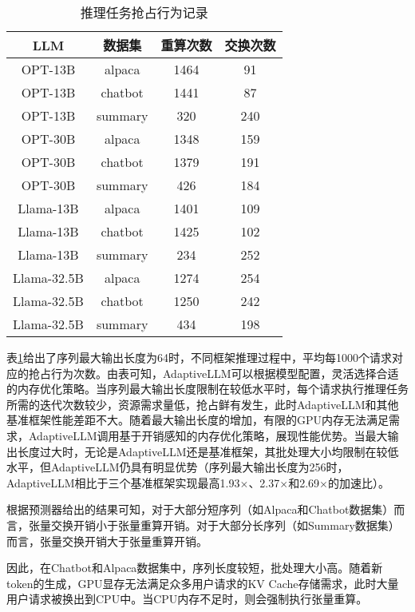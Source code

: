 \begin{table}[H]
  \centering
  \caption{推理任务抢占行为记录}
  \label{Table:推理任务抢占行为记录}
  \renewcommand{\arraystretch}{1.25}
  \small
  \begin{tabular}{c c c c}
    \toprule
    \textbf{LLM} & \textbf{数据集} & \textbf{重算次数} & \textbf{交换次数} \\
    \midrule
    OPT-13B & alpaca & 1464 & 91 \\
    OPT-13B & chatbot & 1441 & 87 \\
    OPT-13B & summary & 320 & 240 \\
    OPT-30B & alpaca & 1348 & 159 \\
    OPT-30B & chatbot & 1379 & 191 \\
    OPT-30B & summary & 426 & 184 \\
    Llama-13B & alpaca & 1401 & 109 \\
    Llama-13B & chatbot & 1425 & 102 \\
    Llama-13B & summary & 234 & 252 \\
    Llama-32.5B & alpaca & 1274 & 254 \\
    Llama-32.5B & chatbot & 1250 & 242 \\
    Llama-32.5B & summary & 434 & 198 \\
    \bottomrule
  \end{tabular}
\end{table}

表\ref{Table:推理任务抢占行为记录}给出了序列最大输出长度为64时，不同框架推理过程中，平均每1000个请求对应的抢占行为次数。由表可知，AdaptiveLLM可以根据模型配置，灵活选择合适的内存优化策略。当序列最大输出长度限制在较低水平时，每个请求执行推理任务所需的迭代次数较少，资源需求量低，抢占鲜有发生，此时AdaptiveLLM和其他基准框架性能差距不大。随着最大输出长度的增加，有限的GPU内存无法满足需求，AdaptiveLLM调用基于开销感知的内存优化策略，展现性能优势。当最大输出长度过大时，无论是AdaptiveLLM还是基准框架，其批处理大小均限制在较低水平，但AdaptiveLLM仍具有明显优势（序列最大输出长度为256时，AdaptiveLLM相比于三个基准框架实现最高1.93$\times$、2.37$\times$和2.69$\times$的加速比）。

根据预测器给出的结果可知，对于大部分短序列（如Alpaca和Chatbot数据集）而言，张量交换开销小于张量重算开销。对于大部分长序列（如Summary数据集）而言，张量交换开销大于张量重算开销。

因此，在Chatbot和Alpaca数据集中，序列长度较短，批处理大小高。随着新token的生成，GPU显存无法满足众多用户请求的KV Cache存储需求，此时大量用户请求被换出到CPU中。当CPU内存不足时，则会强制执行张量重算。

